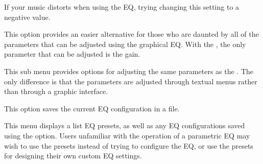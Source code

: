 {\begin {description}
  If your music distorts when using the EQ, trying changing this setting to a 
  negative value.

\item[Simple EQ:]
This option provides an easier alternative for those who are daunted by all of 
the parameters that can be adjusted using the graphical EQ.  With the 
, the only parameter that can be adjusted is the gain.

\item[Advanced EQ:]
This sub menu provides options for adjusting the same parameters as the 
.  The only difference is that the parameters are 
adjusted through textual menus rather than through a graphic interface.

\item[Save EQ Preset:]
This option saves the current EQ configuration in a  file.

\item[Browse EQ Presets:]
This menu displays a list EQ presets, as well as any EQ configurations saved 
using the  option.  Users unfamiliar with the 
operation of a parametric EQ may wish to use the presets instead of trying to 
configure the EQ, or use the presets for designing their own custom EQ 
settings.

\end{description}
}


